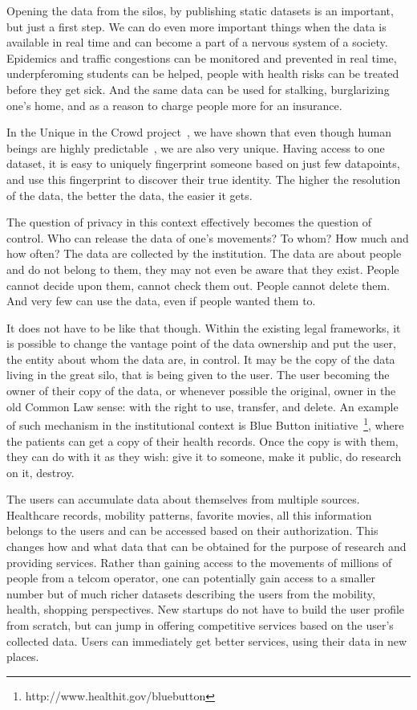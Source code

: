 Opening the data from the silos, by publishing static datasets is an important, but just a first step. 
We can do even more important things when the data is available in real time and can become a part of a nervous system of a society.
Epidemics and traffic congestions can be monitored and prevented in real time, underpferoming students can be helped, people with health risks can be treated before they get sick.
And the same data can be used for stalking, burglarizing one's home, and as a reason to charge people more for an insurance.

In the Unique in the Crowd project~\cite{de2013unique}, we have shown that even though human beings are highly predictable~\cite{song2010limits}, we are also very unique.
Having access to one dataset, it is easy to uniquely fingerprint someone based on just few datapoints, and use this fingerprint to discover their true identity. 
The higher the resolution of the data, the better the data, the easier it gets.

The question of privacy in this context effectively becomes the question of control. 
Who can release the data of one's movements?
To whom? 
How much and how often?
The data are collected by the institution.
The data are about people and do not belong to them, they may not even be aware that they exist.
People cannot decide upon them, cannot check them out.
People cannot delete them.
And very few can use the data, even if people wanted them to.

It does not have to be like that though.
Within the existing legal frameworks, it is possible to change the vantage point of the data ownership and put the user, the entity about whom the data are, in control.
It may be the copy of the data living in the great silo, that is being given to the user.
The user becoming the owner of their copy of the data, or whenever possible the original, owner in the old Common Law sense: with the right to use, transfer, and delete. 
An example of such mechanism in the institutional context is Blue Button initiative~\footnote{http://www.healthit.gov/bluebutton}, where the patients can get a copy of their health records.
Once the copy is with them, they can do with it as they wish: give it to someone, make it public, do research on it, destroy.

The users can accumulate data about themselves from multiple sources. 
Healthcare records, mobility patterns, favorite movies, all this information belongs to the users and can be accessed based on their authorization.
This changes how and what data that can be obtained for the purpose of research and providing services.
Rather than gaining access to the movements of millions of people from a telcom operator, one can potentially gain access to a smaller number but of much richer datasets describing the users from the mobility, health, shopping  perspectives.
New startups do not have to build the user profile from scratch, but can jump in offering competitive services based on the user's collected data.
Users can immediately get better services, using their data in new places.

